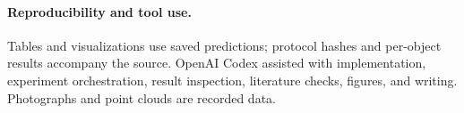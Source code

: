 \paragraph{Reproducibility and tool use.}
Tables and visualizations use saved predictions; protocol hashes and per-object results accompany the source. OpenAI Codex assisted with implementation, experiment orchestration, result inspection, literature checks, figures, and writing. Photographs and point clouds are recorded data.
